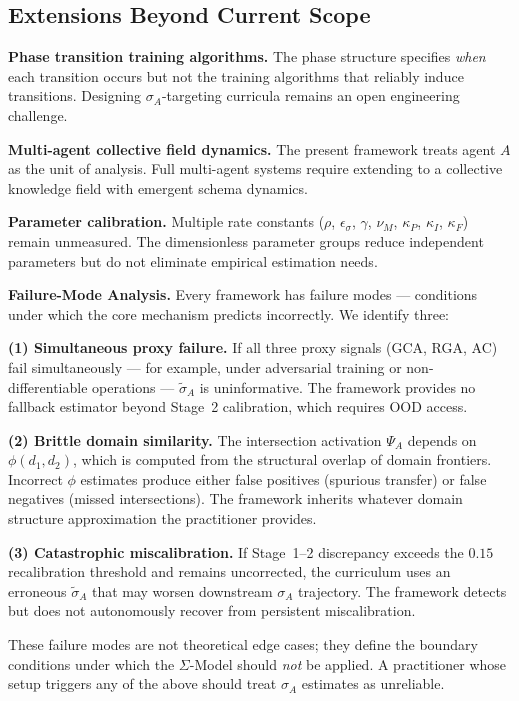 \documentclass[10pt]{article}
\begin{document}
\subsection{Extensions Beyond Current Scope}\label{sec:extensions}

\textbf{Phase transition training algorithms.} The phase structure
specifies \emph{when} each transition occurs but not the training
algorithms that reliably induce transitions. Designing $\sigma_A$-targeting
curricula remains an open engineering challenge.

\textbf{Multi-agent collective field dynamics.} The present framework
treats agent $A$ as the unit of analysis. Full multi-agent systems
require extending to a collective knowledge field with emergent schema
dynamics.

\textbf{Parameter calibration.} Multiple rate constants ($\rho$,
$\epsilon_\sigma$, $\gamma$, $\nu_M$, $\kappa_P$, $\kappa_I$, $\kappa_F$)
remain unmeasured. The dimensionless parameter groups reduce independent
parameters but do not eliminate empirical estimation needs.

\medskip
\noindent\textbf{Failure-Mode Analysis.}
Every framework has failure modes --- conditions under which the core
mechanism predicts incorrectly. We identify three:

\textbf{(1) Simultaneous proxy failure.} If all three proxy signals
(GCA, RGA, AC) fail simultaneously --- for example, under adversarial
training or non-differentiable operations --- $\tilde{\sigma}_A$ is
uninformative. The framework provides no fallback estimator beyond
Stage~2 calibration, which requires OOD access.

\textbf{(2) Brittle domain similarity.} The intersection activation
$\Psi_A$ depends on $\phi(d_1,d_2)$, which is computed from the
structural overlap of domain frontiers. Incorrect $\phi$ estimates
produce either false positives (spurious transfer) or false negatives
(missed intersections). The framework inherits whatever domain structure
approximation the practitioner provides.

\textbf{(3) Catastrophic miscalibration.} If Stage~1--2 discrepancy
exceeds the $0.15$ recalibration threshold and remains
uncorrected, the curriculum uses an erroneous $\tilde{\sigma}_A$ that
may worsen downstream $\sigma_A$ trajectory. The framework detects
but does not autonomously recover from persistent miscalibration.

These failure modes are not theoretical edge cases; they define the
boundary conditions under which the $\Sigma$-Model should \emph{not}
be applied. A practitioner whose setup triggers any of the above
should treat $\sigma_A$ estimates as unreliable.
\end{document}
